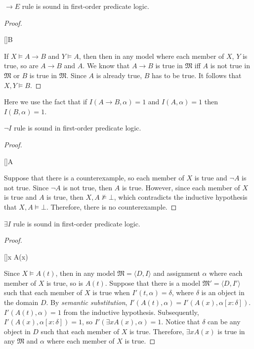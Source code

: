\begin{claim}
$\to E$ rule is sound in first-order predicate logic.
\end{claim}
\begin{proof}
\begin{prooftree*}
[\ce]{B}
\end{prooftree*}
If $X \vDash A \to B$ and $Y \vDash A$, then then in any model where each member of $X$, $Y$ is true, so are $A \to B$ and $A$. We know that $A \to B$ is true in $\mathfrak{M}$ iff $A$ is not true in $\mathfrak{M}$ or $B$ is true in $\mathfrak{M}$. Since $A$ is already true, $B$ has to be true. It follows that $X, Y \vDash B$.
\end{proof}
Here we use the fact that if $I(A \to B, \alpha) = 1$ and $I(A, \alpha) = 1$ then $I(B, \alpha) = 1$.

\begin{claim}
$\neg I$ rule is sound in first-order predicate logic.
\end{claim}
\begin{proof}
\begin{prooftree*}
[]{\neg A}
\end{prooftree*}
Suppose that there is a counterexample, so each member of $X$ is true and $\neg A$ is not true. Since $\neg A$ is not true, then $A$ is true. However, since each member of $X$ is true and $A$ is true, then $X, A \not\vDash \bot$, which contradicts the inductive hypothesis that $X, A \vDash \bot$. Therefore, there is no counterexample.
\end{proof}

\begin{claim}
$\exists I$ rule is sound in first-order predicate logic.
\end{claim}
\begin{proof}
\begin{prooftree*}
[\exi]{\exists x A(x)}
\end{prooftree*}
Since $X \vDash A(t)$, then in any model $\mathfrak{M} = \langle D, I \rangle$ and assignment $\alpha$ where each member of $X$ is true, so is $A(t)$. Suppose that there is a model $\mathfrak{M}' = \langle D, I' \rangle$ such that each member of $X$ is true when $I'(t, \alpha) = \delta$, where $\delta$ is an object in the domain $D$. By \textit{semantic substitution}, $I'(A(t), \alpha) = I'(A(x), \alpha[x : \delta])$. $I'(A(t), \alpha) = 1$ from the inductive hypothesis. Subsequently, $I'(A(x), \alpha[x : \delta]) = 1$, so $I'(\exists x A(x), \alpha) = 1$. Notice that $\delta$ can be any object in $D$ such that each member of $X$ is true. Therefore, $\exists x A(x)$ is true in any $\mathfrak{M}$ and $\alpha$ where each member of $X$ is true.
\end{proof}